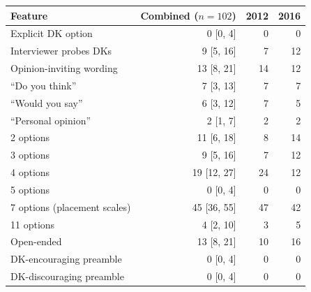 \begin{tabular}{lrrr}
\toprule
Feature & Combined ($n=102$) & 2012 & 2016 \\
\midrule
Explicit DK option & 0 [0, 4] & 0 & 0 \\
Interviewer probes DKs & 9 [5, 16] & 7 & 12 \\
Opinion-inviting wording & 13 [8, 21] & 14 & 12 \\
\quad ``Do you think'' & 7 [3, 13] & 7 & 7 \\
\quad ``Would you say'' & 6 [3, 12] & 7 & 5 \\
\quad ``Personal opinion'' & 2 [1, 7] & 2 & 2 \\
2 options & 11 [6, 18] & 8 & 14 \\
3 options & 9 [5, 16] & 7 & 12 \\
4 options & 19 [12, 27] & 24 & 12 \\
5 options & 0 [0, 4] & 0 & 0 \\
7 options (placement scales) & 45 [36, 55] & 47 & 42 \\
11 options & 4 [2, 10] & 3 & 5 \\
Open-ended & 13 [8, 21] & 10 & 16 \\
DK-encouraging preamble & 0 [0, 4] & 0 & 0 \\
DK-discouraging preamble & 0 [0, 4] & 0 & 0 \\
\bottomrule
\end{tabular}
